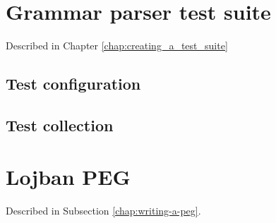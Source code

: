 \chapter{Grammar parser test suite}
\label{appendix:parser-testing-annex}

Described in Chapter \ref{chap:creating_a_test_suite}

\section{Test configuration}



\newpage

\section{Test collection}



\chapter{Lojban PEG}
\label{appendix:peg-annex}

Described in Subsection \ref{chap:writing-a-peg}.

